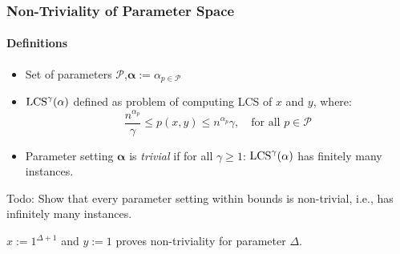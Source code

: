 \begin{frame}
	\frametitle{Non-Triviality of Parameter Space}
	\framesubtitle{Definitions}

	\begin{definition}
		\begin{itemize}
			\setlength{\itemindent}{1em}
			\item Set of parameters $\mathcal{P}$,\quad $\mathbf{\alpha} := \alpha_{p \in \mathcal{P}}$
			\pause
			\item $\text{LCS}^\gamma(\mathbf{\alpha})$ defined as problem of computing LCS of $x$ and $y$, where:
			\begin{displaymath}
				\frac{n^{\alpha_p}}{\gamma} \leq p(x,y) \leq n^{\alpha_p}\gamma, \quad \text{for all } p \in \mathcal{P}
			\end{displaymath}
			\pause
			\item Parameter setting $\mathbf{\alpha}$ is \emph{trivial} if for all $\gamma \geq 1$: $\text{LCS}^\gamma(\mathbf{\alpha})$ has finitely many instances.
		\end{itemize}
	\end{definition}
	\pause
	
	\begin{alertblock}{Todo:}
		Show that every parameter setting within bounds is non-trivial, i.e., has infinitely many instances.
	\end{alertblock}
	
	\begin{example}
		$x := 1^{\Delta + 1}$ and $y := 1$ proves non-triviality for parameter $\Delta$.
	\end{example}
\end{frame}
